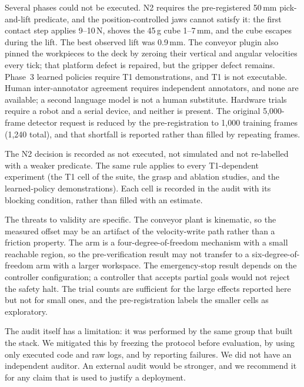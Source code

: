 \documentclass[journal]{IEEEtran}
\begin{document}
Several phases could not be executed. N2 requires the pre-registered 50\,mm pick-and-lift predicate, and the position-controlled jaws cannot satisfy it: the first contact step applies 9--10\,N, shoves the 45\,g cube 1--7\,mm, and the cube escapes during the lift. The best observed lift was 0.9\,mm. The conveyor plugin also pinned the workpieces to the deck by zeroing their vertical and angular velocities every tick; that platform defect is repaired, but the gripper defect remains. Phase~3 learned policies require T1 demonstrations, and T1 is not executable. Human inter-annotator agreement requires independent annotators, and none are available; a second language model is not a human substitute. Hardware trials require a robot and a serial device, and neither is present. The original 5,000-frame detector request is reduced by the pre-registration to 1,000 training frames (1,240 total), and that shortfall is reported rather than filled by repeating frames.

The N2 decision is recorded as not executed, not simulated and not re-labelled with a weaker predicate. The same rule applies to every T1-dependent experiment (the T1 cell of the suite, the grasp and ablation studies, and the learned-policy demonstrations). Each cell is recorded in the audit with its blocking condition, rather than filled with an estimate.

The threats to validity are specific. The conveyor plant is kinematic, so the measured offset may be an artifact of the velocity-write path rather than a friction property. The arm is a four-degree-of-freedom mechanism with a small reachable region, so the pre-verification result may not transfer to a six-degree-of-freedom arm with a larger workspace. The emergency-stop result depends on the controller configuration; a controller that accepts partial goals would not reject the safety halt. The trial counts are sufficient for the large effects reported here but not for small ones, and the pre-registration labels the smaller cells as exploratory.

The audit itself has a limitation: it was performed by the same group that built the stack. We mitigated this by freezing the protocol before evaluation, by using only executed code and raw logs, and by reporting failures. We did not have an independent auditor. An external audit would be stronger, and we recommend it for any claim that is used to justify a deployment.
\end{document}
